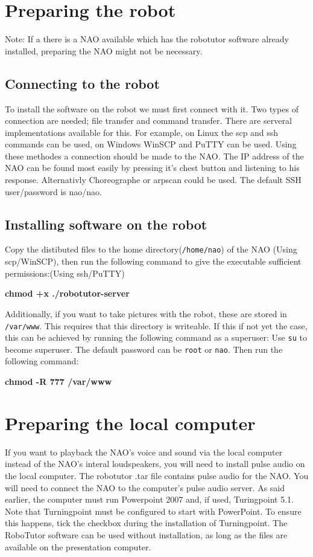 
\section{Preparing the robot}
Note: If a there is a NAO available which has the robotutor software already installed, preparing the NAO might not be necessary.

\subsection{Connecting to the robot}
To install the software on the robot we must first connect with it. Two types of connection are needed; file transfer and command transfer. There are serveral implementations available for this. For example, on Linux the scp and ssh commands can be used, on Windows WinSCP and PuTTY can be used. Using these methodes a connection should be made to the NAO. The IP address of the NAO can be found most easily by pressing it's chest button and listening to his response. Alternativly Choreographe or arpscan could be used. The default SSH user/password is nao/nao. 

\subsection{Installing software on the robot}

Copy the distibuted files to the home directory(\texttt{/home/nao}) of the NAO (Using scp/WinSCP), then run the following command to give the executable sufficient permissions:(Using ssh/PuTTY)

\textbf{chmod +x ./robotutor-server}

Additionally, if you want to take pictures with the robot, these are stored in \texttt{/var/www}. This requires that this directory is writeable. If this if not yet the case, this can be achieved by running the following command as a superuser:
Use \texttt{su} to become superuser. The default password can be \texttt{root} or \texttt{nao}. Then run the following command:

\textbf{chmod -R 777 /var/www }



\section{Preparing the local computer}
If you want to playback the NAO's voice and sound via the local computer instead of the NAO's interal loudspeakers, you will need to install pulse audio on the local computer. The robotutor .tar file contains pulse audio for the NAO. You will need to connect the NAO to the computer's pulse audio server. As said earlier, the computer must run Powerpoint 2007 and, if used, Turingpoint 5.1. Note that Turningpoint must be configured to start with PowerPoint. To ensure this happens, tick the checkbox during the installation of Turningpoint. The RoboTutor software can be used without installation, as long as the files are available on the presentation computer.

